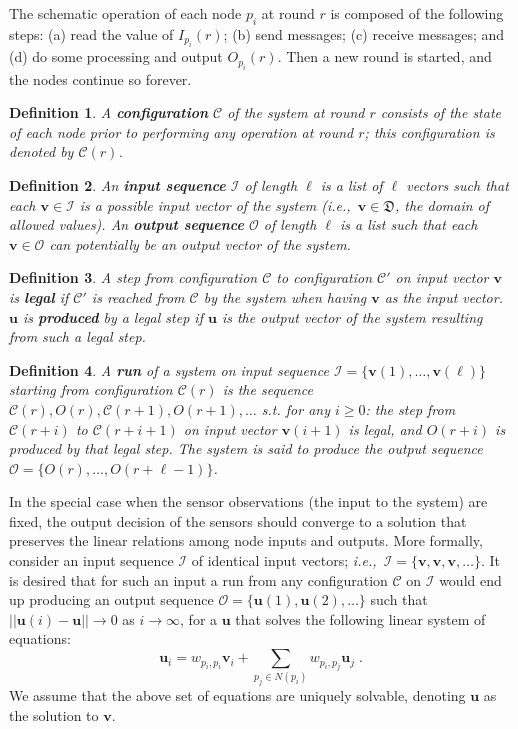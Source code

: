 \documentclass[preprint,12pt]{elsarticle}
\newtheorem{definition}{Definition}
\newcommand{\ie}{\emph{i.e.,\ }}
\newcommand\C{\mathcal{C}}
\newcommand\N{N}\newcommand\fl{f_{\!\ell}}
\newcommand\norm[1]{\left|\left|#1\right|\right|}
\newcommand{\uu}{\mathbf{u}}
\newcommand{\vv}{\mathbf{v}}
\newcommand{\Or}[1]{O(#1)}
\newcommand{\II}[2]{I_{#1}(#2)}
\newcommand{\OO}[2]{O_{#1}(#2)}
\begin{document}
The schematic operation of each node $p_i$ at round $r$ is
composed of the following steps: (a) read the value of
$\II{p_i}{r}$; (b) send messages; (c) receive messages; and (d) do
some processing and output $\OO{p_i}{r}$. Then a new round is
started, and the nodes continue so forever.

\begin{definition}
  A {\bf configuration} $\C$ of the system at round $r$ consists of the state
  of each node prior to performing any operation at round $r$;
  this configuration is denoted by $\C(r)$.
\end{definition}

\begin{definition}
  An {\bf input sequence} $\mathcal{I}$ of length $\ell$ is a list of  $\ell$ vectors such that each $\vv \in \mathcal{I}$
  is a possible input vector of the system (\ie $\vv \in \mathfrak{D}$, the domain of allowed values).
  An {\bf output sequence} $\mathcal{O}$ of length $\ell$ is a list
  such that each $\vv \in \mathcal{O}$
  can potentially be an output vector of the system.
\end{definition}

\begin{definition}
  A step from configuration $\C$ to configuration $\C'$ on input vector
  $\vv$ is {\bf legal} if $\C'$ is reached from $\C$ by the
  system when having $\vv$ as the input vector.
$\uu$ is {\bf produced} by a legal step if
  $\uu$ is the output vector of the system resulting from such a legal step.
\end{definition}

\begin{definition}
  A {\bf run} of a system on input sequence $\mathcal{I} = \{\vv(1), \dots, \vv(\ell)\}$ starting
  from configuration $\C(r)$ is the sequence $\C(r), \Or{r}, \C(r+1), \Or{r+1}, \dots$
  s.t. for any $i \geq 0$: the step from $\C(r+i)$ to $\C(r+i+1)$ on input vector
  $\vv(i+1)$ is legal, and  $\Or{r+i}$ is produced by that
  legal step. The system is said to produce the output sequence
  $\mathcal{O} = \{\Or{r}, \dots, \Or{r+\ell-1}\}$.
\end{definition}

In the special case when the sensor observations (the input to the
system) are fixed, the output decision of the sensors should converge to
a solution that preserves the linear relations among node inputs
and outputs. More formally, consider an input sequence
$\mathcal{I}$ of identical input vectors; \ie $\mathcal{I} =
\{\vv, \vv, \vv, \dots\}$. It is desired that for such an input a run
from any configuration $\C$ on $\mathcal{I}$ would end up
producing an output sequence $\mathcal{O} = \{\uu(1), \uu(2),
\dots\}$ such that $\norm{\uu(i)-\uu} \rightarrow 0$ as $i
\rightarrow \infty$, for a $\uu$ that solves the following linear
system of equations:
\begin{equation}\label{eq:Opdef}
  \uu_i =
  w_{p_i,p_i} \vv_i + \sum_{p_j \in \N(p_i)}w_{p_i, p_j}
  \uu_j\;.
\end{equation}
We assume that the above set of equations are uniquely solvable, denoting
$\uu$ as the solution to $\vv$.
\end{document}
